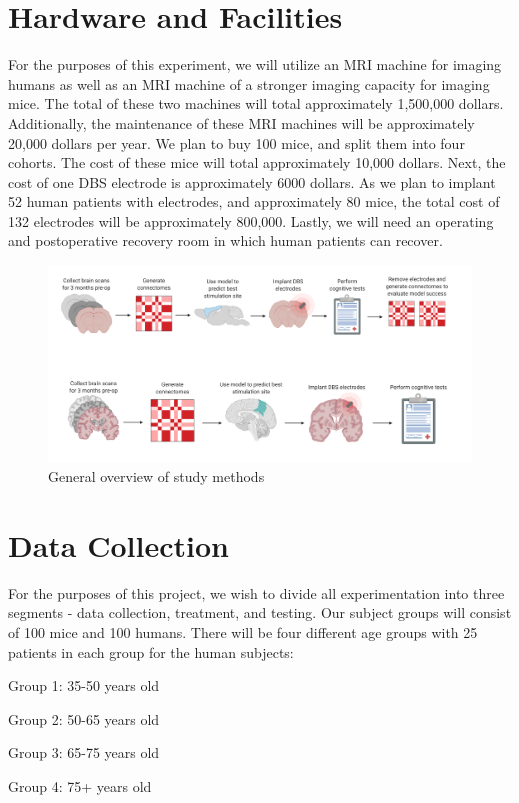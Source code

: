 \documentclass{article}
\begin{document}
\section{Hardware and Facilities}
For the purposes of this experiment, we will utilize an MRI machine for imaging humans as well as an MRI machine of a stronger imaging capacity for imaging mice. The total of these two machines will total approximately 1,500,000 dollars. Additionally, the maintenance of these MRI machines will be approximately 20,000 dollars per year. We plan to buy 100 mice, and split them into four cohorts. The cost of these mice will total approximately 10,000 dollars. Next, the cost of one DBS electrode is approximately 6000 dollars. As we plan to implant 52 human patients with electrodes, and approximately 80 mice, the total cost of 132 electrodes will be approximately 800,000. Lastly, we will need an operating and postoperative recovery room in which human patients can recover. 

\begin{figure}[!]
\centering
\includegraphics[width=120mm, scale=0.5]{Connectomics.png}
\caption{General overview of study methods}
\label{fig:method}
\end{figure}

\section{Data Collection}
For the purposes of this project, we wish to divide all experimentation into three segments - data collection, treatment, and testing. Our subject groups will consist of 100 mice and 100 humans. There will be four different age groups with 25 patients in each group for the human subjects:

Group 1: 35-50 years old

Group 2: 50-65 years old

Group 3: 65-75 years old

Group 4: 75+ years old
\end{document}
